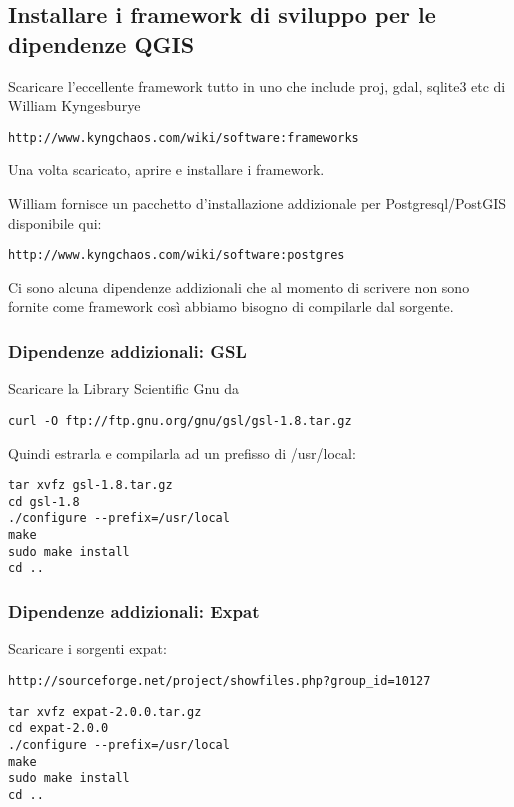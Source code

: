 \subsection{Installare i framework di sviluppo per le dipendenze QGIS}
Scaricare l'eccellente framework tutto in uno che include proj, gdal, sqlite3 etc di William Kyngesburye

\begin{verbatim}
http://www.kyngchaos.com/wiki/software:frameworks
\end{verbatim}

Una volta scaricato, aprire e installare i framework.

William fornisce un pacchetto d'installazione addizionale per Postgresql/PostGIS disponibile qui:

\begin{verbatim}
http://www.kyngchaos.com/wiki/software:postgres 
\end{verbatim}

Ci sono alcuna dipendenze addizionali che al momento di scrivere non sono fornite come framework così abbiamo bisogno di compilarle dal sorgente.

\subsubsection{Dipendenze addizionali: GSL}
Scaricare la Library Scientific Gnu da

\begin{verbatim}
curl -O ftp://ftp.gnu.org/gnu/gsl/gsl-1.8.tar.gz 
\end{verbatim}

Quindi estrarla e compilarla ad un prefisso di /usr/local:

\begin{verbatim}
tar xvfz gsl-1.8.tar.gz 
cd gsl-1.8 
./configure --prefix=/usr/local 
make
sudo make install
cd ..  
\end{verbatim}

\subsubsection{Dipendenze addizionali: Expat}
Scaricare i sorgenti expat:

\begin{verbatim}
http://sourceforge.net/project/showfiles.php?group_id=10127 
\end{verbatim}

\begin{verbatim}
tar xvfz expat-2.0.0.tar.gz 
cd expat-2.0.0 
./configure --prefix=/usr/local
make 
sudo make install 
cd ..  
\end{verbatim}

